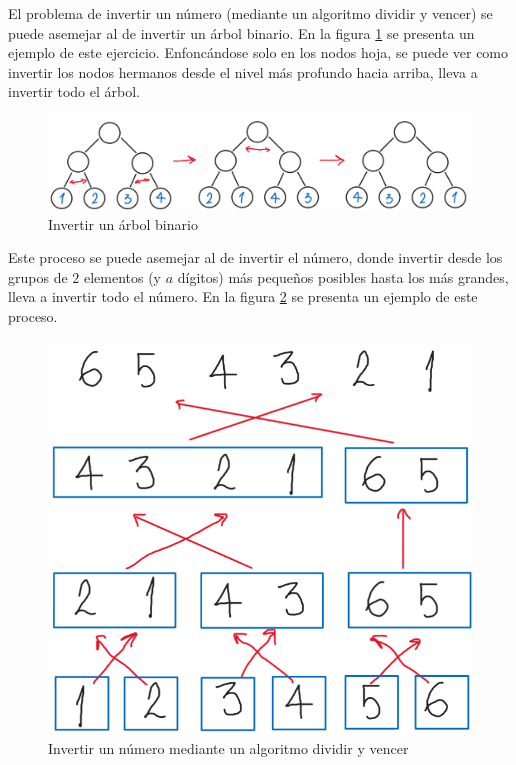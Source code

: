 \documentclass[letter]{article}
\begin{document}
El problema de invertir un número (mediante un algoritmo dividir y vencer) se puede asemejar al de invertir un árbol binario. En la figura \ref{fig:invertir_arbol} se presenta un ejemplo de este ejercicio. Enfoncándose solo en los nodos hoja, se puede ver como invertir los nodos hermanos desde el nivel más profundo hacia arriba, lleva a invertir todo el árbol. \par

\begin{figure}[!ht]
    \centering
    \includegraphics[scale=0.25]{img/fig2.png}
    \vspace{-1em}
    \caption{Invertir un árbol binario}
    \label{fig:invertir_arbol}
\end{figure}

Este proceso se puede asemejar al de invertir el número, donde invertir desde los grupos de $2$ elementos (y $a$ dígitos) más pequeños posibles hasta los más grandes, lleva a invertir todo el número. En la figura \ref{fig:invertir_numero} se presenta un ejemplo de este proceso.

\begin{figure}[!ht]
    \centering
    \includegraphics[scale=0.20]{img/fig3.png}
    \vspace{-1em}
    \caption{Invertir un número mediante un algoritmo dividir y vencer}
    \label{fig:invertir_numero}
\end{figure}
\end{document}
